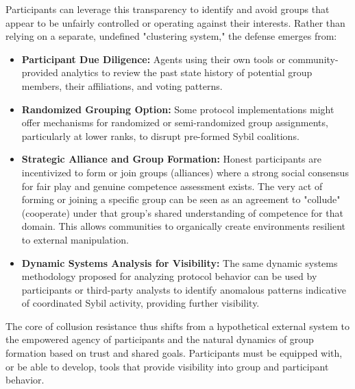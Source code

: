 \documentclass{article}
\begin{document}
\begin{CJK}{UTF8}{gbsn}
            {{Participants can leverage this transparency to identify and avoid groups that appear to be unfairly controlled or operating against their interests. Rather than relying on a separate, undefined "clustering system," the defense emerges from:}}
        \begin{itemize}
            \item \textbf{Participant Due Diligence:} Agents using their own tools or community-provided analytics to review the past state history of potential group members, their affiliations, and voting patterns.
            \item \textbf{Randomized Grouping Option:} Some protocol implementations might offer mechanisms for randomized or semi-randomized group assignments, particularly at lower ranks, to disrupt pre-formed Sybil coalitions.
            \item \textbf{Strategic Alliance and Group Formation:} Honest participants are incentivized to form or join groups (alliances) where a strong social consensus for fair play and genuine competence assessment exists. The very act of forming or joining a specific group can be seen as an agreement to "collude" (cooperate) under that group's shared understanding of competence for that domain. This allows communities to organically create environments resilient to external manipulation.
            \item \textbf{Dynamic Systems Analysis for Visibility:} The same dynamic systems methodology proposed for analyzing protocol behavior can be used by participants or third-party analysts to identify anomalous patterns indicative of coordinated Sybil activity, providing further visibility.
        \end{itemize}
        {{The core of collusion resistance thus shifts from a hypothetical external system to the empowered agency of participants and the natural dynamics of group formation based on trust and shared goals. Participants must be equipped with, or be able to develop, tools that provide visibility into group and participant behavior.}}


\end{CJK}
\end{document}
